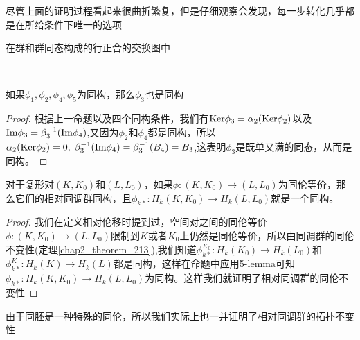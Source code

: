 \begin{remark}
尽管上面的证明过程看起来很曲折繁复，但是仔细观察会发现，每一步转化几乎都是在所给条件下唯一的选项
\end{remark}
\begin{corollary}[5-lemma]
在群和群同态构成的行正合的交换图中
{\center{}\\}
如果$\phi_{1},\phi_{2},\phi_{4},\phi_{5}$为同构，那么$\phi_{3}$也是同构
\end{corollary}
\begin{proof}
根据上一命题以及四个同构条件，我们有${\rm Ker}\phi_{3}=\alpha_{2}({\rm Ker}\phi_{2})$以及${\rm Im}\phi_{3}=\beta_{3}^{-1}({\rm Im}\phi_{4})$,又因为$\phi_{2}$和$\phi_{4}$都是同构，所以$\alpha_{2}({\rm Ker}\phi_{2})=0,\;\beta_{3}^{-1}({\rm Im}\phi_{4})=\beta_{3}^{-1}(B_{4})=B_{3}$,这表明$\phi_{3}$是既单又满的同态，从而是同构。
\end{proof}
\begin{theorem}[相对同调群的同伦不变性]
对于复形对$(K,K_{0})$和$(L,L_{0})$，如果$\phi:(K,K_{0})\rightarrow (L,L_{0})$为同伦等价，那么它们的相对同调群同构，且$\phi_{k*}:H_{k}(K,K_{0})\rightarrow H_{k}(L,L_{0})$就是一个同构。
\end{theorem}
\begin{proof}
我们在定义相对伦移时提到过，空间对之间的同伦等价$\phi:(K,K_{0})\rightarrow (L,L_{0})$限制到$K$或者$K_{0}$上仍然是同伦等价，所以由同调群的同伦不变性(定理\eqref{chap2_theorem_213}),我们知道$\phi_{k*}^{K_{0}}:H_{k}(K_{0})\rightarrow H_{k}(L_{0})$和$\phi_{k*}^{K}:H_{k}(K)\rightarrow H_{k}(L)$都是同构，这样在命题中应用5-lemma可知$\phi_{k*}:H_{k}(K,K_{0})\rightarrow H_{k}(L,L_{0})$为同构。这样我们就证明了相对同调群的同伦不变性
\end{proof}
\begin{remark}
由于同胚是一种特殊的同伦，所以我们实际上也一并证明了相对同调群的拓扑不变性
\end{remark}
